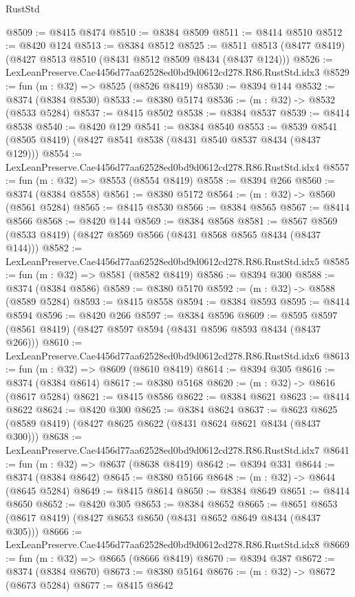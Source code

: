 \begin{lexlean}{RustStd}
\begin{coremodule}
@8509 := @8415 @8474
@8510 := @8384 @8509
@8511 := @8414 @8510
@8512 := @8420 @124
@8513 := @8384 @8512
@8525 := @8511 @8513 (@8477 @8419) (@8427 @8513 @8510 (@8431 @8512 @8509 @8434 (@8437 @124)))
@8526 := LexLeanPreserve.Cae4456d77aa62528ed0bd9d0612cd278.R86.RustStd.idx3
@8529 := fun (m : @32) => @8525 (@8526 @8419)
@8530 := @8394 @144
@8532 := @8374 (@8384 @8530)
@8533 := @8380 @5174
@8536 := (m : @32) -> @8532 (@8533 @5284)
@8537 := @8415 @8502
@8538 := @8384 @8537
@8539 := @8414 @8538
@8540 := @8420 @129
@8541 := @8384 @8540
@8553 := @8539 @8541 (@8505 @8419) (@8427 @8541 @8538 (@8431 @8540 @8537 @8434 (@8437 @129)))
@8554 := LexLeanPreserve.Cae4456d77aa62528ed0bd9d0612cd278.R86.RustStd.idx4
@8557 := fun (m : @32) => @8553 (@8554 @8419)
@8558 := @8394 @266
@8560 := @8374 (@8384 @8558)
@8561 := @8380 @5172
@8564 := (m : @32) -> @8560 (@8561 @5284)
@8565 := @8415 @8530
@8566 := @8384 @8565
@8567 := @8414 @8566
@8568 := @8420 @144
@8569 := @8384 @8568
@8581 := @8567 @8569 (@8533 @8419) (@8427 @8569 @8566 (@8431 @8568 @8565 @8434 (@8437 @144)))
@8582 := LexLeanPreserve.Cae4456d77aa62528ed0bd9d0612cd278.R86.RustStd.idx5
@8585 := fun (m : @32) => @8581 (@8582 @8419)
@8586 := @8394 @300
@8588 := @8374 (@8384 @8586)
@8589 := @8380 @5170
@8592 := (m : @32) -> @8588 (@8589 @5284)
@8593 := @8415 @8558
@8594 := @8384 @8593
@8595 := @8414 @8594
@8596 := @8420 @266
@8597 := @8384 @8596
@8609 := @8595 @8597 (@8561 @8419) (@8427 @8597 @8594 (@8431 @8596 @8593 @8434 (@8437 @266)))
@8610 := LexLeanPreserve.Cae4456d77aa62528ed0bd9d0612cd278.R86.RustStd.idx6
@8613 := fun (m : @32) => @8609 (@8610 @8419)
@8614 := @8394 @305
@8616 := @8374 (@8384 @8614)
@8617 := @8380 @5168
@8620 := (m : @32) -> @8616 (@8617 @5284)
@8621 := @8415 @8586
@8622 := @8384 @8621
@8623 := @8414 @8622
@8624 := @8420 @300
@8625 := @8384 @8624
@8637 := @8623 @8625 (@8589 @8419) (@8427 @8625 @8622 (@8431 @8624 @8621 @8434 (@8437 @300)))
@8638 := LexLeanPreserve.Cae4456d77aa62528ed0bd9d0612cd278.R86.RustStd.idx7
@8641 := fun (m : @32) => @8637 (@8638 @8419)
@8642 := @8394 @331
@8644 := @8374 (@8384 @8642)
@8645 := @8380 @5166
@8648 := (m : @32) -> @8644 (@8645 @5284)
@8649 := @8415 @8614
@8650 := @8384 @8649
@8651 := @8414 @8650
@8652 := @8420 @305
@8653 := @8384 @8652
@8665 := @8651 @8653 (@8617 @8419) (@8427 @8653 @8650 (@8431 @8652 @8649 @8434 (@8437 @305)))
@8666 := LexLeanPreserve.Cae4456d77aa62528ed0bd9d0612cd278.R86.RustStd.idx8
@8669 := fun (m : @32) => @8665 (@8666 @8419)
@8670 := @8394 @387
@8672 := @8374 (@8384 @8670)
@8673 := @8380 @5164
@8676 := (m : @32) -> @8672 (@8673 @5284)
@8677 := @8415 @8642

\end{coremodule}
\end{lexlean}
